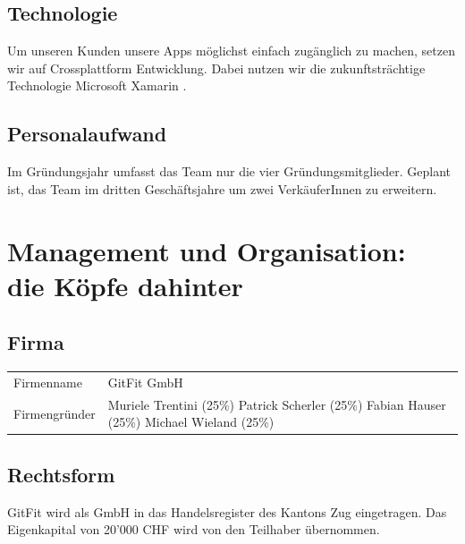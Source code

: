 \subsection{Technologie}
Um unseren Kunden unsere Apps möglichst einfach zugänglich zu machen, setzen wir auf Crossplattform Entwicklung. Dabei nutzen wir die zukunftsträchtige Technologie Microsoft Xamarin \cite{xamarin} .
\subsection{Personalaufwand}
Im Gründungsjahr umfasst das Team nur die vier Gründungsmitglieder. Geplant ist, das Team im dritten Geschäftsjahre um zwei VerkäuferInnen zu erweitern.

\clearpage
\section{Management und Organisation:  \\ \hspace{25pt}die Köpfe dahinter}

\subsection{Firma}
\begin{tabu} to \linewidth {l X}
	Firmenname & GitFit GmbH \\
	Firmengründer & Muriele Trentini (25\%)  \newline Patrick Scherler (25\%) \newline Fabian Hauser (25\%) \newline Michael Wieland (25\%) \\
\end{tabu} 

\subsection{Rechtsform}
GitFit wird als GmbH in das Handelsregister des Kantons Zug eingetragen. Das Eigenkapital von 20'000 CHF wird von den Teilhaber übernommen.


